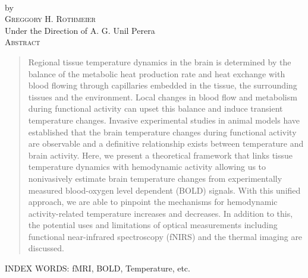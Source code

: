 \thispagestyle{empty}
\begin{center}
  { \huge \thesisTitle } \\
  \vspace{0.5in}
  by \\
  \vspace{0.5in}
  { \large \textsc{Greggory H. Rothmeier} } \\
  \vspace{0.5in}
  Under the Direction of A. G. Unil Perera\\
  \vspace{0.5in}
  \textsc{Abstract}
  \vspace{0.2in}
\end{center}
  \begin{quote}
    Regional tissue temperature dynamics in the brain is determined by the balance of the metabolic heat production rate and heat exchange with blood flowing through capillaries embedded in the tissue, the surrounding tissues and the environment. Local changes in blood flow and metabolism during functional activity can upset this balance and induce transient temperature changes. Invasive experimental studies in animal models have established that the brain temperature changes during functional activity are observable and a definitive relationship exists between temperature and brain activity. Here, we present a theoretical framework that links tissue temperature dynamics with hemodynamic activity allowing us to nonivasively estimate brain temperature changes from experimentally measured blood-oxygen level dependent (BOLD) signals. With this unified approach, we are able to pinpoint the mechanisms for hemodynamic activity-related temperature increases and decreases.  In addition to this, the potential uses and limitations of optical measurements including functional near-infrared spectroscopy (fNIRS) and the thermal imaging are discussed.  
  \end{quote}
\vspace*{\fill}
INDEX WORDS: fMRI, BOLD, Temperature, etc.